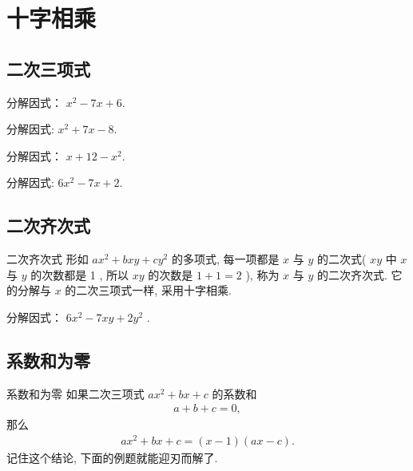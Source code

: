 \documentclass[aspectratio=169]{ctexbeamer}
\theoremstyle{definition}
\begin{document}
\section{十字相乘}
\subsection{二次三项式}
\begin{frame}[t]
	\begin{example}
		分解因式： $x^{2}-7 x+6.$
	\end{example}
\end{frame}

\begin{frame}[t]
	\begin{example}
		分解因式: $x^{2}+7 x-8$.
	\end{example}
\end{frame}

\begin{frame}[t]
	\begin{example}
		分解因式： $x+12-x^{2}$.
	\end{example}
\end{frame}

\begin{frame}[t]
	\begin{example}[二次项系数不为 1]
		分解因式: $6 x^{2}-7 x+2$.
	\end{example}
\end{frame}

\subsection{二次齐次式}
\begin{frame}{二次齐次式}
	形如 $a x^{2}+b x y+c y^{2}$ 的多项式, 每一项都是 $x$ 与 $y$ 的二次式( $x y$ 中 $x$ 与 $y$ 的次数都是 1 , 所以 $x y$ 的次数是 $1+1=2$ ), 称为 $x$ 与 $y$ 的二次齐次式. 它的分解与 $x$ 的二次三项式一样, 采用十字相乘.
\end{frame}

\begin{frame}[t]
	\begin{example}
		分解因式： $6 x^{2}-7 x y+2 y^{2}$ .
	\end{example}
\end{frame}

\subsection{系数和为零}
\begin{frame}{系数和为零}
	如果二次三项式 $a x^{2}+b x+c$ 的系数和
	\begin{align*}
		a+b+c=0,
	\end{align*}
	那么
	\begin{align*}
		a x^{2}+b x+c=(x-1)(a x-c) .
	\end{align*}
	记住这个结论, 下面的例题就能迎刃而解了.
\end{frame}
\end{document}
